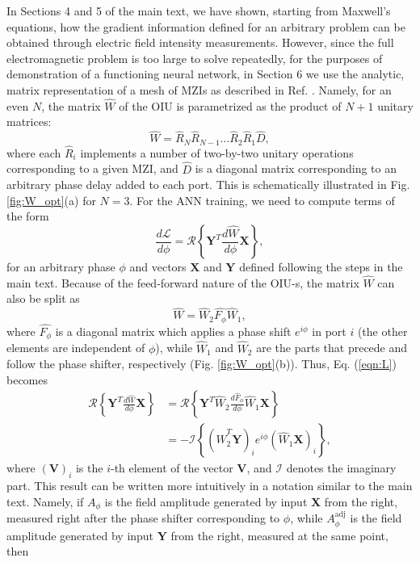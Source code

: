 In Sections 4 and 5 of the main text, we have shown, starting from Maxwell's equations, how the gradient information defined for an arbitrary problem can be obtained through electric field intensity measurements. However, since the full electromagnetic problem is too large to solve repeatedly, for the purposes of demonstration of a functioning neural network, in Section 6 we use the analytic, matrix representation of a mesh of MZIs as described in Ref. \cite{Clements2016}. Namely, for an even $N$, the matrix $\hat{W}$ of the OIU is parametrized as the product of $N + 1$ unitary matrices:
%
\begin{equation}
\hat{W} = \hat{R}_N \hat{R}_{N-1} \dots \hat{R}_2 \hat{R}_1 \hat{D} ,
\label{eq:W_R}
\end{equation}
%
where each $\hat{R}_i$ implements a number of two-by-two unitary operations corresponding to a given MZI, and $\hat{D}$ is a diagonal matrix corresponding to an arbitrary phase delay added to each port. This is schematically illustrated in Fig. \ref{fig:W_opt}(a) for $N = 3$. For the ANN training, we need to compute terms of the form 
%
\begin{equation}
\frac{d\mathcal{L}}{d\phi} =
\mathcal{R}\left\{ \mathbf{Y}^T \frac{d \hat{W}}{d\phi} \mathbf{X} \right\},
\label{eqn:L}
\end{equation}
%
for an arbitrary phase $\phi$ and vectors $\mathbf{X}$ and $\mathbf{Y}$ defined following the steps in the main text. Because of the feed-forward nature of the OIU-s, the matrix $\hat{W}$ can also be split as
%
\begin{equation}
\hat{W} = \hat{W}_2 \hat{F_\phi} \hat{W}_1,
\end{equation}
%
where $\hat{F_\phi}$ is a diagonal matrix which applies a phase shift $e^{i\phi}$ in port $i$ (the other elements are independent of $\phi$), while $\hat{W}_1$ and $\hat{W}_2$ are the parts that precede and follow the phase shifter, respectively (Fig. \ref{fig:W_opt}(b)). Thus, Eq. (\ref{eqn:L}) becomes 
%
\begin{align}
\mathcal{R}\left\{ \mathbf{Y}^T \frac{d \hat{W}}{d\phi} \mathbf{X} \right\} &= \mathcal{R}\left\{ \mathbf{Y}^T \hat{W}_2 \frac{d\hat{F}_\phi}{d \phi} \hat{W}_1 \mathbf{X} \right\} \label{eqn:XY}
\\ \nonumber
& = -\mathcal{I}\left\{(\hat{W}_2^T \mathbf{Y})_i e^{i\phi} (\hat{W}_1 \mathbf{X})_i \right\},
\end{align}
%
where $(\mathbf{V})_i$ is the $i$-th element of the vector $\mathbf{V}$, and $\mathcal{I}$ denotes the imaginary part. This result can be written more intuitively in a notation similar to the main text. Namely, if $A_\phi$ is the field amplitude generated by input $\mathbf{X}$ from the right, measured right after the phase shifter corresponding to $\phi$, while $A^{\mathrm{adj}}_\phi$ is the field amplitude generated by input $\mathbf{Y}$ from the right, measured at the same point, then
